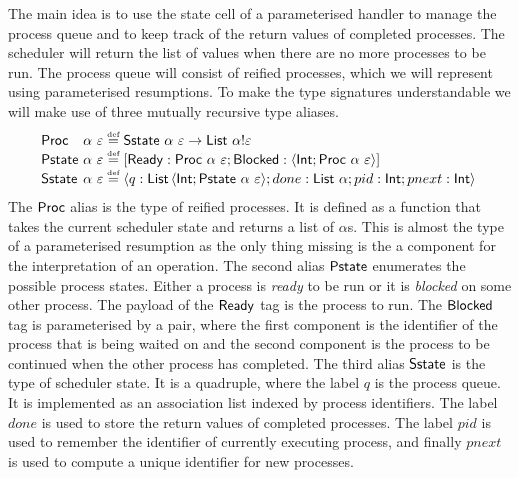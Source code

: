 \documentclass[12pt,phd,lfcs,twoside,openright,logo,leftchapter,normalheadings]{infthesis}
\theoremstyle{plain}
\theoremstyle{definition}
\begin{document}
The main idea is to use the state cell of a parameterised handler to
manage the process queue and to keep track of the return values of
completed processes. The scheduler will return the list of values when
there are no more processes to be run. The process queue will consist
of reified processes, which we will represent using parameterised
resumptions. To make the type signatures understandable we will make
use of three mutually recursive type aliases.
%
\[
  \ba{@{~}l@{~}l@{~}c@{~}l}
    \Proc   &\alpha~\varepsilon   &\defas& \Sstate~\alpha~\varepsilon \to \List~\alpha \eff \varepsilon\\
    \Pstate &\alpha~\varepsilon &\defas& [\Ready:\Proc~\alpha~\varepsilon;\Blocked:\Record{\Int;\Proc~\alpha~\varepsilon}]\\
    \Sstate &\alpha~\varepsilon &\defas& \Record{q:\List\,\Record{\Int;\Pstate~\alpha~\varepsilon};done:\List~\alpha;pid:\Int;pnext:\Int}\\
  \ea
\]
%
The $\mathsf{Proc}$ alias is the type of reified processes. It is defined as a
function that takes the current scheduler state and returns a list of
$\alpha$s. This is almost the type of a parameterised resumption as
the only thing missing is the a component for the interpretation of an
operation.
%
The second alias $\mathsf{Pstate}$ enumerates the possible process
states. Either a process is \emph{ready} to be run or it is
\emph{blocked} on some other process. The payload of the $\mathsf{Ready}$ tag
is the process to run. The $\mathsf{Blocked}$ tag is parameterised by a pair,
where the first component is the identifier of the process that is
being waited on and the second component is the process to be
continued when the other process has completed.
%
The third alias $\mathsf{Sstate}$ is the type of scheduler state. It is a
quadruple, where the label $q$ is the process queue. It is implemented
as an association list indexed by process identifiers. The label
$done$ is used to store the return values of completed processes. The
label $pid$ is used to remember the identifier of currently executing
process, and finally $pnext$ is used to compute a unique identifier
for new processes.
\end{document}
